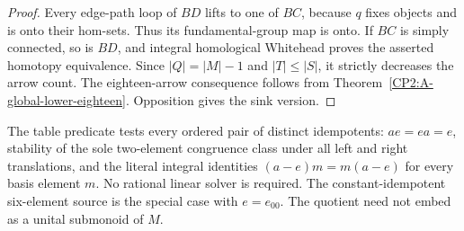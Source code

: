 \begin{proof}
Every edge-path loop of $BD$ lifts to one of $BC$, because $q$ fixes
objects and is onto their hom-sets.  Thus its fundamental-group map
is onto.  If $BC$ is simply connected, so is $BD$, and integral
homological Whitehead proves the asserted homotopy equivalence.
Since $|Q|=|M|-1$ and $|T|\leq|S|$, it strictly decreases the arrow
count.  The eighteen-arrow consequence follows from
Theorem~\ref{CP2:A-global-lower-eighteen}.  Opposition gives the
sink version.
\end{proof}

\begin{remark*}
The table predicate tests every ordered pair of distinct idempotents:
$ae=ea=e$, stability of the sole two-element congruence class under
all left and right translations, and the literal integral identities
$(a-e)m=m(a-e)$ for every basis element $m$.  No rational linear
solver is required.  The constant-idempotent six-element source is
the special case with $e=e_{00}$.  The quotient need not embed as
a unital submonoid of $M$.
\end{remark*}
